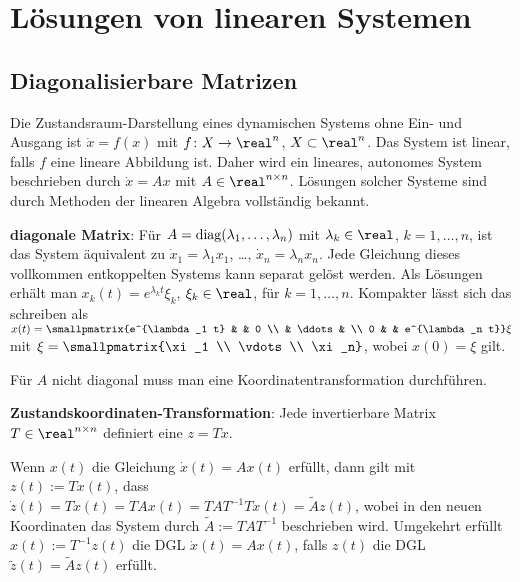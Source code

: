 \chapter{%
    Lösungen von linearen Systemen%
}

\section{%
    Diagonalisierbare Matrizen%
}

Die Zustandsraum-Darstellung eines dynamischen Systems ohne Ein- und Ausgang ist
$\dot{x} = f(x)$ mit $f\colon X \rightarrow \real^n$, $X \subset \real^n$.
Das System ist linear, falls $f$ eine lineare Abbildung ist.
Daher wird ein lineares, autonomes System beschrieben durch $\dot{x} = Ax$ mit
$A \in \real^{n \times n}$.
Lösungen solcher Systeme sind durch Methoden der linearen Algebra vollständig bekannt.

\linie

\textbf{diagonale Matrix}:
Für $A = \operatorname{diag}(\lambda_1, \dotsc, \lambda_n)$ mit $\lambda_k \in \real$, $k = 1, \dotsc, n$,
ist das System äquivalent zu $\dot{x}_1 = \lambda_1 x_1$, \dots, $\dot{x}_n = \lambda_n x_n$.
Jede Gleichung dieses vollkommen entkoppelten Systems kann separat gelöst werden.
Als Lösungen erhält man $x_k(t) = e^{\lambda_k t} \xi_k$, $\xi_k \in \real$, für
$k = 1, \dotsc, n$.
Kompakter lässt sich das schreiben als
$x(t) = \smallpmatrix{e^{\lambda_1 t} & & 0 \\ & \ddots & \\ 0 & & e^{\lambda_n t}} \xi$ mit
$\xi = \smallpmatrix{\xi_1 \\ \vdots \\ \xi_n}$, wobei $x(0) = \xi$ gilt.

\linie

Für $A$ nicht diagonal muss man eine Koordinatentransformation durchführen.

\textbf{Zustandskoordinaten-Transformation}:
Jede invertierbare Matrix $T \in \real^{n \times n}$ definiert eine
 $z = Tx$.

Wenn $x(t)$ die Gleichung $\dot{x}(t) = Ax(t)$ erfüllt, dann gilt mit $z(t) := Tx(t)$, dass\\
$\dot{z}(t) = T\dot{x}(t) = TAx(t) = TAT^{-1} Tx(t) = \widetilde{A} z(t)$,
wobei in den neuen Koordinaten das System durch $\widetilde{A} := TAT^{-1}$ beschrieben wird.
Umgekehrt erfüllt $x(t) := T^{-1} z(t)$ die DGL $\dot{x}(t) = Ax(t)$, falls
$z(t)$ die DGL $\widetilde{z}(t) = \widetilde{A} z(t)$ erfüllt.

